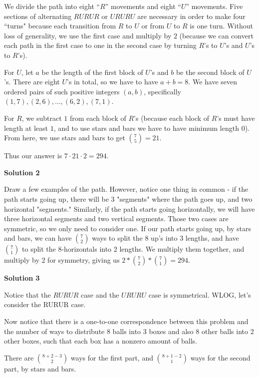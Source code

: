 \begin{enumerate}
We divide the path into eight “$R$” movements and eight “$U$” movements. Five sections of alternating $RURUR$ or $URURU$ are necessary in order to make four “turns" because each transition from $R$ to $U$ or from $U$ to $R$ is one turn. Without loss of generality, we use the first case and multiply by $2$ (because we can convert each path in the first case to one in the second case by turning $R$'s to $U$'s and $U$'s to $R$'s).

 
For $U$, let $a$ be the length of the first block of $U$'s and $b$ be the second block of $U$'s. There are eight $U$'s in total, so we have to have $a+b=8$. We have seven ordered pairs of such positive integers $(a,b)$, specifically $(1,7),(2,6),\ldots,(6,2),(7,1)$.

 For $R$, we subtract $1$ from each block of $R$'s (because each block of $R$'s must have length at least $1$, and to use stars and bars we have to have minimum length $0$). From here, we use stars and bars to get ${7 \choose 5}=21$.

 
Thus our answer is $7\cdot21\cdot2=\boxed{294}$.

 



\textbf{Solution 2}

Draw a few examples of the path. However, notice one thing in common - if the path starts going up, there will be 3 "segments" where the path goes up, and two horizontal "segments." Similarly, if the path starts going horizontally, we will have three horizontal segments and two vertical segments. Those two cases are symmetric, so we only need to consider one. If our path starts going up, by stars and bars, we can have $\binom{7}{2}$ ways to split the 8 up's into 3 lengths, and have $\binom{7}{1}$ to split the 8-horizontals into 2 lengths. We multiply them together, and multiply by 2 for symmetry, giving us $2*\binom{7}{2}*\binom{7}{1}=294.$




\textbf{Solution 3}

Notice that the $RURUR$ case and the $URURU$ case is symmetrical. WLOG, let's consider the RURUR case.

 Now notice that there is a one-to-one correspondence between this problem and the number of ways to distribute 8 balls into 3 boxes and also 8 other balls into 2 other boxes, such that each box has a nonzero amount of balls.

 There are ${8+2-3 \choose 2}$ ways for the first part, and ${8+1-2 \choose 1}$ ways for the second part, by stars and bars.


\end{enumerate}

